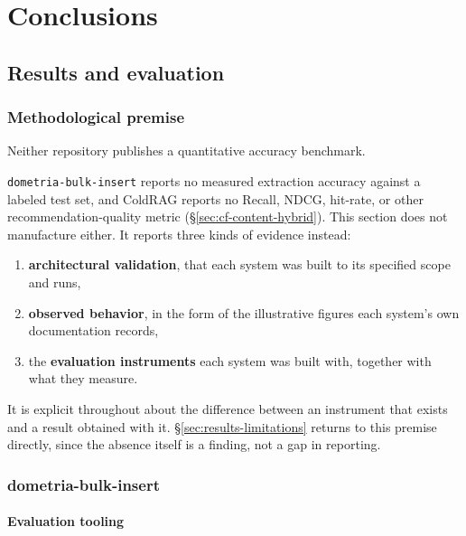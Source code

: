 \chapter{Conclusions}
\label{ch:conclusions}

\section{Results and evaluation}
\label{sec:conclusions-results}


\subsection{Methodological premise}
\label{sec:results-premise}

Neither repository publishes a quantitative accuracy benchmark. 

\vspace{0.3cm}

\texttt{dometria-bulk-insert} reports no measured extraction accuracy against a labeled test set, and ColdRAG reports no Recall, NDCG, hit-rate, or other recommendation-quality metric (\S\ref{sec:cf-content-hybrid}). This section does not manufacture either. It reports three kinds of evidence instead: 
\begin{enumerate}
\item \textbf{architectural validation}, that each system was built to its specified scope and runs,
\item \textbf{observed behavior}, in the form of the illustrative figures each system's own documentation records, 
\item the \textbf{evaluation instruments} each system was built with, together with what they measure. 
\end{enumerate}
It is explicit throughout about the difference between an instrument that exists and a result obtained with it. \S\ref{sec:results-limitations} returns to this premise directly, since the absence itself is a finding, not a gap in reporting.

\subsection{dometria-bulk-insert}
\label{sec:results-bulk-insert}

\subsubsection{Evaluation tooling}
\label{sec:results-bulk-insert-tooling}

